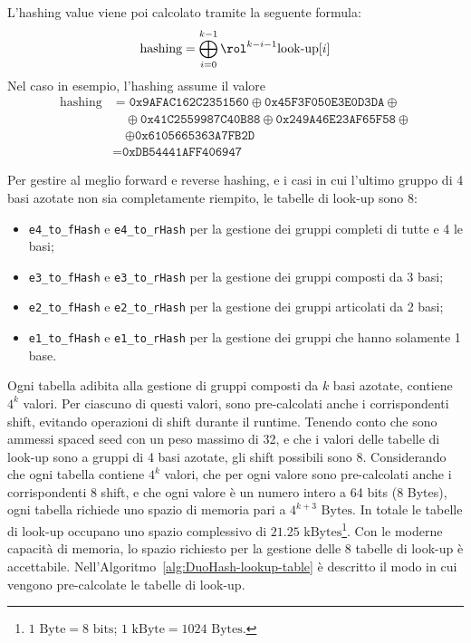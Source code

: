 \begin{example}
	L'hashing value viene poi calcolato tramite la seguente formula: \[ \text{hashing} = \bigoplus_{i = 0}^{k - 1} \rol^{k - i - 1} \text{look-up}[i] \] 
	Nel caso in esempio, l'hashing assume il valore \begin{align*}
		\text{hashing} &= \texttt{0x9AFAC162C2351560} \oplus \texttt{0x45F3F050E3E0D3DA} \oplus {} \\
		&\quad {} \oplus \texttt{0x41C2559987C40B88} \oplus \texttt{0x249A46E23AF65F58} \oplus {} \\
		&\quad {} \oplus \texttt{0x6105665363A7FB2D} \\
		&= \texttt{0xDB54441AFF406947} 
	\end{align*}
\end{example}

Per gestire al meglio forward e reverse hashing, e i casi in cui l'ultimo gruppo di 4 basi azotate non sia completamente riempito, le tabelle di look-up sono 8:
\begin{itemize}
	\item \verb|e4_to_fHash| e \verb|e4_to_rHash| per la gestione dei gruppi completi di tutte e 4 le basi;
	\item \verb|e3_to_fHash| e \verb|e3_to_rHash| per la gestione dei gruppi composti da 3 basi;
	\item \verb|e2_to_fHash| e \verb|e2_to_rHash| per la gestione dei gruppi articolati da 2 basi;
	\item \verb|e1_to_fHash| e \verb|e1_to_rHash| per la gestione dei gruppi che hanno solamente 1 base.
\end{itemize}

Ogni tabella adibita alla gestione di gruppi composti da $k$ basi azotate, contiene $4^k$ valori. Per ciascuno di questi valori, sono pre-calcolati anche i corrispondenti shift, evitando operazioni di shift durante il runtime.
Tenendo conto che sono ammessi spaced seed con un peso massimo di 32, e che i valori delle tabelle di look-up sono a gruppi di 4 basi azotate, gli shift possibili sono 8.
Considerando che ogni tabella contiene $4^k$ valori, che per ogni valore sono pre-calcolati anche i corrispondenti 8 shift, e che ogni valore è un numero intero a 64 bits (8 Bytes), ogni tabella richiede uno spazio di memoria pari a $4^{k + 3} \text{ Bytes}$. In totale le tabelle di look-up occupano uno spazio complessivo di $21.25 \text{ kBytes}$\footnote{$1 \text{ Byte} = 8 \text{ bits}$; $1 \text{ kByte} = 1024 \text{ Bytes}$.}. Con le moderne capacità di memoria, lo spazio richiesto per la gestione delle 8 tabelle di look-up è accettabile. Nell'Algoritmo~\ref{alg:DuoHash-lookup-table} è descritto il modo in cui vengono pre-calcolate le tabelle di look-up.

